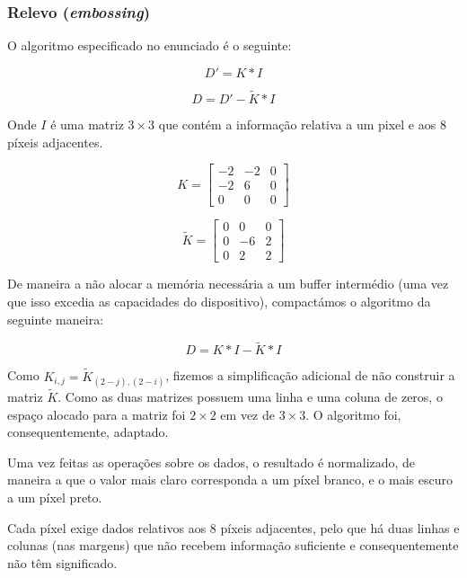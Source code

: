 \documentclass[a4paper,12pt]{article}
\begin{document}
\subsubsection{Relevo (\textit{embossing})}
\label{subsec:relevo}

O algoritmo especificado no enunciado é o seguinte:

\[
D' = K \ast I
\]

\[
D = D' - \widetilde{K} \ast I
\]

Onde $I$ é uma matriz $3 \times 3$ que contém a informação relativa a um pixel e aos 8 píxeis adjacentes.

\[ K =
\begin{bmatrix}
-2 & -2 & 0\\
-2 & 6 & 0\\
0 & 0 & 0
\end{bmatrix}
\]

\[\widetilde{K} = 
\begin{bmatrix}
0&0&0\\
0&-6&2\\
0&2&2
\end{bmatrix}
\]

De maneira a não alocar a memória necessária a um buffer intermédio (uma vez que isso excedia as capacidades do dispositivo), compactámos o algoritmo da seguinte maneira:

\[
D = K \ast I - \widetilde{K} \ast I
\]

Como $K_{i,j} = \widetilde{K}_{(2-j),(2-i)}$, fizemos a simplificação adicional de não construir a matriz $\widetilde{K}$. Como as duas matrizes possuem uma linha e uma coluna de zeros, o espaço alocado para a matriz foi $2\times2$ em vez de $3\times3$. O algoritmo foi, consequentemente, adaptado.

\clearpage


Uma vez feitas as operações sobre os dados, o resultado é normalizado, de maneira a que o valor mais claro corresponda a um píxel branco, e o mais escuro a um píxel preto.

Cada píxel exige dados relativos aos 8 píxeis adjacentes, pelo que há duas linhas e colunas (nas margens) que não recebem informação suficiente e consequentemente não têm significado.
\end{document}
